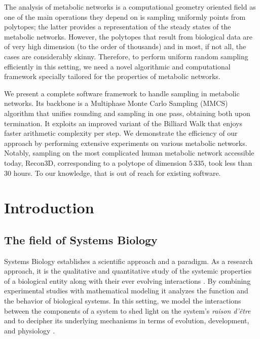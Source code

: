    The analysis of metabolic networks is a computational geometry oriented field
   as one of the main operations they depend on is sampling uniformly points from  polytopes;
   the latter provides a representation of the steady states of the metabolic networks.
   However, the polytopes that result from biological data are of very high dimension (to the order of thousands) and in most, if not all, the cases are considerably skinny.
   Therefore, to perform uniform random sampling efficiently in this setting, we need
   a novel algorithmic and computational framework specially tailored
   for the properties of metabolic networks.

   We present a complete software framework to handle sampling in metabolic networks.
   Its backbone is a Multiphase Monte Carlo Sampling (MMCS) algorithm
   that unifies rounding and sampling in one pass, obtaining both upon termination.
   It exploits an
   improved variant of the Billiard Walk that enjoys faster arithmetic complexity per step.
   We demonstrate the efficiency of our approach by performing extensive experiments
   on various metabolic networks.
   Notably, sampling on the most complicated human metabolic network accessible today, Recon3D,
   corresponding to a polytope of dimension  $5\,335$, took less than $30$ hours.
   To our knowledge, that is out of reach for existing software.

\section{Introduction}
\label{sec:mmcs-intro}

   \subsection{The field of Systems Biology}

   Systems Biology establishes a scientific approach and a paradigm. As a
   research approach, it is the qualitative and quantitative study of the systemic
   properties of a biological entity along with their ever evolving interactions
   \citep{klipp2016systems, kohl2010systems}.
   By combining experimental studies  with mathematical
   modeling it analyzes the function and the behavior of biological systems.
   In this setting, we model the interactions between the  components of a system
   to shed light  on the system's \textit{raison d'être} and to decipher its underlying mechanisms
   in terms of evolution, development, and physiology \citep{ideker2001new}.


